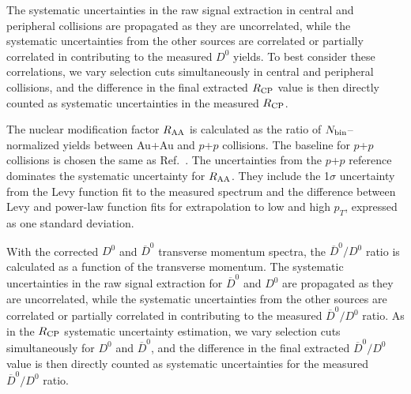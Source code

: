 \documentclass[%
 reprint,	
 amsmath,amssymb,
 aps,
 prc,
]{revtex4-1}
\begin{document}
The systematic uncertainties in the raw signal extraction in central and peripheral collisions are propagated as they are uncorrelated, while the systematic uncertainties from the other sources are correlated or partially correlated in contributing to the measured $D^0$ yields. To best consider these correlations, we vary selection cuts simultaneously in central and peripheral collisions, and the difference in the final extracted $R_{\rm CP}$ value is then directly counted as systematic uncertainties in the measured $R_{\rm CP}$.

The nuclear modification factor $R_{\rm AA}$ is calculated as the ratio of $N_{\rm bin}$--normalized yields between Au+Au and $p$+$p$ collisions. The baseline for $p$+$p$ collisions is chosen the same as Ref.~\cite{Star_D_RAA}. The uncertainties from the $p$+$p$ reference dominates the systematic uncertainty for $R_{\rm AA}$. They include the 1$\sigma$ uncertainty from the Levy function fit to the measured spectrum and the difference between Levy and power-law function fits for extrapolation to low and high $p_T$, expressed as one standard deviation.

With the corrected $D^0$ and $\overline{D}^{0}$ transverse momentum spectra, the $\overline{D}^{0}/D^0$ ratio is calculated as a function of the transverse momentum. The systematic uncertainties in the raw signal extraction for $\overline{D}^{0}$ and $D^0$ are propagated as they are uncorrelated, while the systematic uncertainties from the other sources are correlated or partially correlated in contributing to the measured $\overline{D}^{0}/D^0$ ratio. As in the $R_{\rm CP}$ systematic uncertainty estimation, we vary selection cuts simultaneously for $D^0$ and $\overline{D}^{0}$, and the difference in the final extracted $\overline{D}^{0}/D^0$ value is then directly counted as systematic uncertainties for the measured $\overline{D}^{0}/D^0$ ratio.
\end{document}
